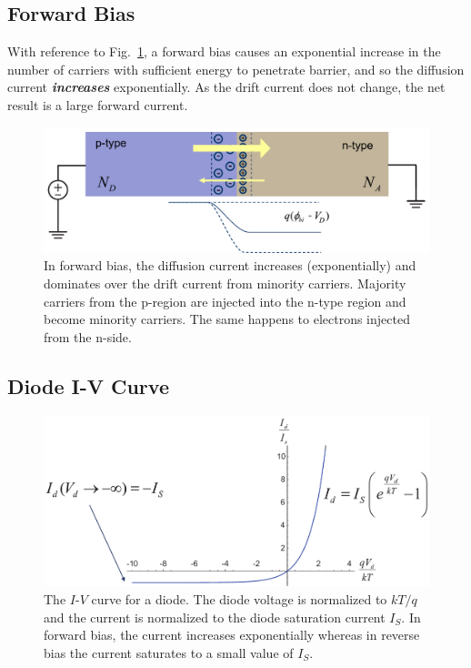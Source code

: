 \subsection{Forward Bias}
With reference to Fig.~\ref{fig:slide36b}, a forward bias causes an exponential increase in the number of carriers with sufficient energy to penetrate barrier, and so the diffusion current \textbf{\textit{increases}} exponentially.  As the drift current does not change, the net result is a large forward current.
\begin{figure}[tb]
\begin{center}
\includegraphics[width=.75\columnwidth]{slide36b}
\end{center}
\caption{In forward bias, the diffusion current increases (exponentially) and dominates over the drift current from minority carriers.  Majority carriers from the p-region are injected into the n-type region and become minority carriers. The same happens to electrons injected from the n-side.} \label{fig:slide36b}
\end{figure}
\subsection{Diode I-V Curve}
\begin{figure}[tb]
\begin{center}
\includegraphics[width=.75\columnwidth]{slide38}
\end{center}
\caption{The $I$-$V$ curve for a diode.  The diode voltage is normalized to $kT/q$ and the current is normalized to the diode saturation current $I_S$.   In forward bias, the current increases exponentially whereas in reverse bias the current saturates to a small value of $I_S$.}
\label{fig:slide38}
\end{figure}

